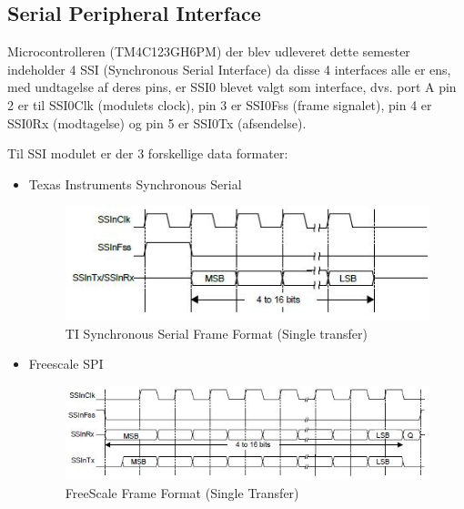 \subsection{Serial Peripheral Interface}
\label{subsec:SPI}

Microcontrolleren (TM4C123GH6PM) der blev udleveret dette semester  indeholder 4 SSI (Synchronous Serial Interface) da disse 4 interfaces alle er ens, med undtagelse af deres pins, er SSI0 blevet valgt som interface, dvs. port A pin 2 er til SSI0Clk (modulets clock), pin 3 er SSI0Fss (frame signalet), pin 4 er SSI0Rx (modtagelse) og pin 5 er SSI0Tx (afsendelse).

Til SSI modulet er der 3 forskellige data formater:

\begin{itemize}
	\item Texas Instruments Synchronous Serial
		\begin{figure}[ht]
			\begin{center}
			\includegraphics[scale=1]{Billeder/TI_Synchronous_Serial_Frame_Format.jpg}
			\end{center}
			\caption{TI Synchronous Serial Frame Format (Single transfer)}
			\label{fig:TIFrameFormat}
		\end{figure}

	\item Freescale SPI
		\begin{figure}[ht]
			\begin{center}
			\includegraphics[scale=1]{Billeder/FS_Frame_Format.jpg}
			\end{center}
			\caption{FreeScale Frame Format (Single Transfer)}
			\label{fig:FSFrameFormat}
		\end{figure}
		  

\end{itemize}
